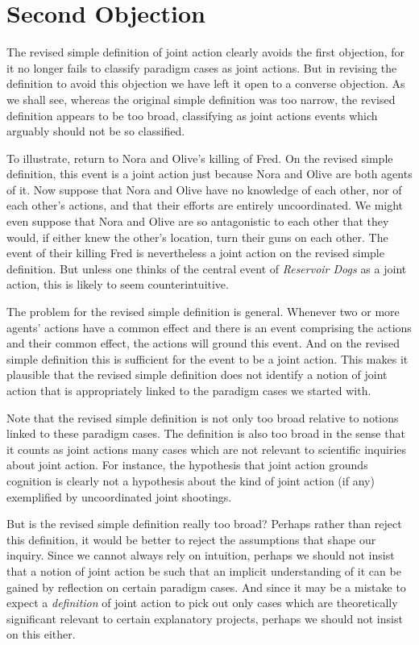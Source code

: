 \documentclass[12pt,a4paper]{extarticle}
\begin{document}
\section{Second Objection}
The revised simple definition of joint action clearly avoids the first objection, for it no longer fails to classify paradigm cases as joint actions.
But in revising the definition to avoid this objection we have left it open to a converse objection.
As we shall see, 
whereas the original simple definition was too narrow,
the revised definition appears to be too broad, classifying as joint actions events which arguably should not be so classified.

To illustrate, return to Nora and Olive's killing of Fred.
On the revised simple definition, this event is a joint action just because Nora and Olive are both agents of it.
Now suppose that Nora and Olive have no knowledge of each other, nor of each other's actions, and that their efforts are entirely uncoordinated.
We might even suppose that Nora and Olive are so antagonistic to each other that they would, if either knew the other's location, turn their guns on each other.
The event of their killing Fred is nevertheless a joint action on the revised simple definition.
But unless one thinks of the central event of \emph{Reservoir Dogs} \citep{Tarantino:1992fk} as a joint action, this is likely to seem counterintuitive.

The problem for the revised simple definition is general.
Whenever two or more agents' actions have a common effect and there is an event comprising the actions and their common effect,
the actions will ground this event.
And on the revised simple definition this is sufficient for the event to be a joint action.
This makes it plausible that the revised simple definition does not identify a notion of joint action that is appropriately linked to the paradigm cases we started with.

Note that the revised simple definition is not only too broad relative to notions linked to these paradigm cases.
The definition is also too broad in the sense that it counts as joint actions many cases which are not relevant to scientific inquiries about joint action.
For instance, the hypothesis that joint action grounds cognition \citep[p.\ 103]{Knoblich:2006bn} is clearly not a hypothesis about the kind of joint action (if any) exemplified by uncoordinated joint shootings.

But is the revised simple definition really too broad?
Perhaps rather than reject this definition, it would be better to reject the assumptions that shape our inquiry.
Since we cannot always rely on intuition, perhaps we should not insist that a notion of joint action be such that an implicit understanding of it can be gained by reflection on certain paradigm cases.
And since it may be a mistake to expect a \emph{definition} of joint action to pick out only cases which are theoretically significant relevant to certain explanatory projects,
perhaps we should not insist on this either.
\end{document}

